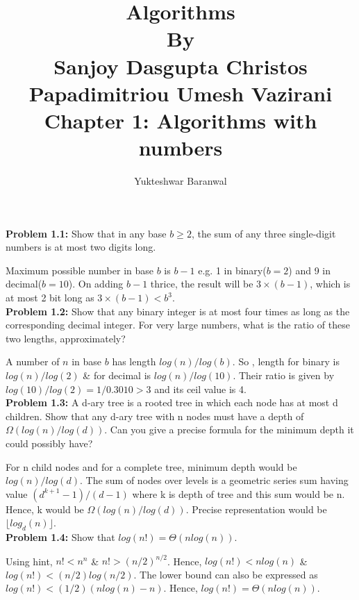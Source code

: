 \documentclass[11pt]{article}
\title{Algorithms\\By\\Sanjoy Dasgupta Christos Papadimitriou Umesh Vazirani \\ Chapter 1: Algorithms with numbers}
\author{Yukteshwar Baranwal}
\begin{document}
	\maketitle
	
	\textbf{Problem 1.1:} Show that in any base $b \geq 2$, the sum of any three single-digit numbers is at
	most two digits long.
	
	Maximum possible number in base $b$ is $b-1$ e.g. 1 in binary($b = 2$) and 9 in decimal($b=10$). On adding $b-1$ thrice, the result will be $3\times (b-1)$, which is at most 2 bit long as $3\times (b-1) < b^3$.\\
	
	\textbf{Problem 1.2:} Show that any binary integer is at most four times as long as the corresponding decimal integer. For very large numbers, what is the ratio of these two lengths,	approximately?
	
	A number of $n$ in base $b$ has length $log(n)/log(b)$. So , length for binary is $log(n)/log(2)$ \& for decimal is $log(n)/log(10)$. Their ratio is given by $log(10)/log(2) = 1/0.3010 > 3$ and its ceil value is 4.\\
	
	\textbf{Problem 1.3:} A d-ary tree is a rooted tree in which each node has at most d children. Show that any d-ary tree with n nodes must have a depth of $\Omega(log(n)/log(d))$. Can you give a precise formula for the minimum depth it could possibly have?
	
	For n child nodes and for a complete tree, minimum depth would be $log(n)/log(d)$. The sum of nodes over levels is a geometric series sum having value $(d^{k+1}-1)/(d-1)$ where k is depth of tree and this sum would be n. Hence, k would be $\Omega(log(n)/log(d))$. Precise representation would be $\lfloor log_d(n)\rfloor$.\\
	
	\textbf{Problem 1.4:} Show that $log(n!) = \Theta(nlog(n))$.
	
	Using hint, $n! < n^n$ \& $n! > (n/2)^{n/2}$. Hence, $log(n!) < nlog(n)$ \& $log(n!) < (n/2)log(n/2)$. The lower bound can also be expressed as $log(n!) < (1/2)(nlog(n) - n)$. Hence, $log(n!) = \Theta(nlog(n))$.
	
	
\end{document}
